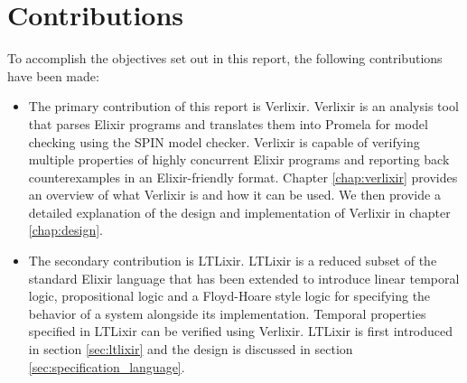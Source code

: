 \section{Contributions}
To accomplish the objectives set out in this report, the following contributions have been made:
\begin{itemize}
    \item The primary contribution of this report is Verlixir. Verlixir is an analysis tool that parses Elixir programs and translates them into Promela \cite{promela} for model checking using the SPIN \cite{spin} model checker. Verlixir is capable of verifying multiple properties of highly concurrent Elixir programs and reporting back counterexamples in an Elixir-friendly format. Chapter \ref{chap:verlixir} provides an overview of what Verlixir is and how it can be used. We then provide a detailed explanation of the design and implementation of Verlixir in chapter \ref{chap:design}.
    \item The secondary contribution is LTLixir. LTLixir is a reduced subset of the standard Elixir language that has been extended to introduce linear temporal logic, propositional logic and a Floyd-Hoare style logic for specifying the behavior of a system alongside its implementation. Temporal properties specified in LTLixir can be verified using Verlixir. LTLixir is first introduced in section \ref{sec:ltlixir} and the design is discussed in section \ref{sec:specification_language}.
\end{itemize}